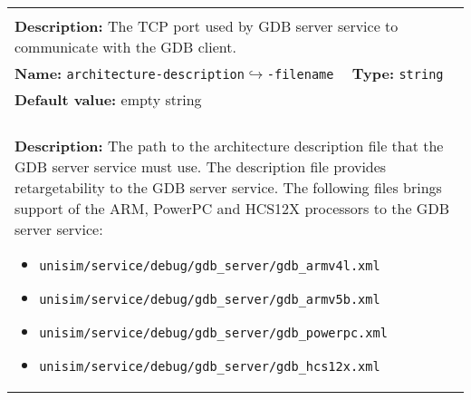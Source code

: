 \begin{center}
\begin{tabular}{|p{7.5cm}|p{7.5cm}|}
		\multicolumn{2}{|l|}{}\\
		\multicolumn{2}{|p{15cm}|}{\textbf{Description:} \newline The TCP port used by GDB server service to communicate with the GDB client.}\\
		\hline
		\multicolumn{1}{|p{7.5cm}}{\textbf{Name:} \texttt{architecture-description\newline$\hookrightarrow$-filename}} & \multicolumn{1}{p{7.5cm}|}{\textbf{Type:} \texttt{string}}\\
		\multicolumn{2}{|p{15cm}|}{\textbf{Default value:} empty string}\\
		\multicolumn{2}{|l|}{}\\
		\multicolumn{2}{|p{15cm}|}{\textbf{Description:} \newline The path to the architecture description file that the GDB server service must use. The description file provides retargetability to the GDB server service. The following files brings support of the ARM, PowerPC and HCS12X processors to the GDB server service: 
		\begin{itemize}
			\item \texttt{unisim/service/debug/gdb\_server/gdb\_armv4l.xml}
			\item \texttt{unisim/service/debug/gdb\_server/gdb\_armv5b.xml}
			\item \texttt{unisim/service/debug/gdb\_server/gdb\_powerpc.xml}
			\item \texttt{unisim/service/debug/gdb\_server/gdb\_hcs12x.xml}
		\end{itemize}
		}\\
		\hline
	\end{tabular}
\end{center}

